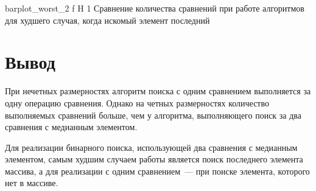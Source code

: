 {barplot_worst_2}
{f}
{H}
{1\textwidth}
{Сравнение количества сравнений при работе алгоритмов для худшего случая, когда искомый элемент последний}

\section{Вывод}
При нечетных размерностях алгоритм поиска с одним сравнением выполняется за одну операцию сравнения. 
Однако на четных размерностях количество выполняемых сравнений больше, чем у алгоритма, выполняющего поиск за два сравнения с медианным элементом.

Для реализации бинарного поиска, использующей два сравнения с медианным элементом, самым худшим случаем работы является поиск последнего элемента массива, а для реализации с одним сравнением~--- при поиске элемента, которого нет в массиве.
